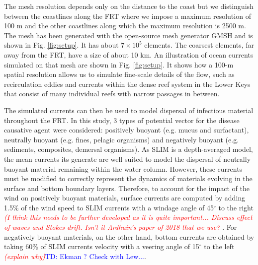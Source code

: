 \documentclass[utf8]{frontiersSCNS}
\newcommand{\emphc}[1]{\emph{\textcolor{red}{#1}}}
\begin{document}
The mesh resolution depends only on the distance to the coast but we distinguish between the coastlines along the FRT where we impose a maximum resolution of 100 m and the other coastlines along which the maximum resolution is 2500 m. The mesh has been generated with the open-source mesh generator GMSH \citep{Geuzaine2009} and is shown in Fig. \ref{fig:setup}. It has about $7 \times 10^5$ elements. The coarsest elements, far away from the FRT, have a size of about 10 km. An illustration of ocean currents simulated on that mesh are shown in Fig. \ref{fig:setup}. It shows how a 100-m spatial resolution allows us to simulate fine-scale details of the flow, such as recirculation eddies and currents within the dense reef system in the Lower Keys that consist of many individual reefs with narrow passages in between. 

The simulated currents can then be used to model dispersal of infectious material throughout the FRT. In this study, 3 types of potential vector for the disease causative agent were considered: positively buoyant (e.g. mucus and surfactant), neutrally buoyant (e.g. fines, pelagic organisms) and negatively buoyant (e.g. sediments, composites, demersal organisms). As SLIM is a depth-averaged model, the mean currents its generate are well suited to model the dispersal of neutrally buoyant material remaining within the water column. However, these currents must be modified to correctly represent the dynamics of materials evolving in the surface and bottom boundary layers. Therefore, to account for the impact of the wind on positively buoyant materials, surface currents are computed by adding 1.5\% of the wind speed to SLIM currents with a windage angle of 45$^\circ$ to the right \citep{ardhuin2009observation} \emphc{(I think this needs to be further developed as it is quite important... Discuss effect of waves and Stokes drift. Isn't it Ardhuin's paper of 2018 that we use? }. For negatively buoyant materials, on the other hand, bottom currents are obtained by taking 60\% of SLIM currents velocity with a veering angle of 15$^\circ$ to the left \emphc{(explain why)}\textcolor{blue}{TD: Ekman ? Check with Lew...}.
\end{document}
